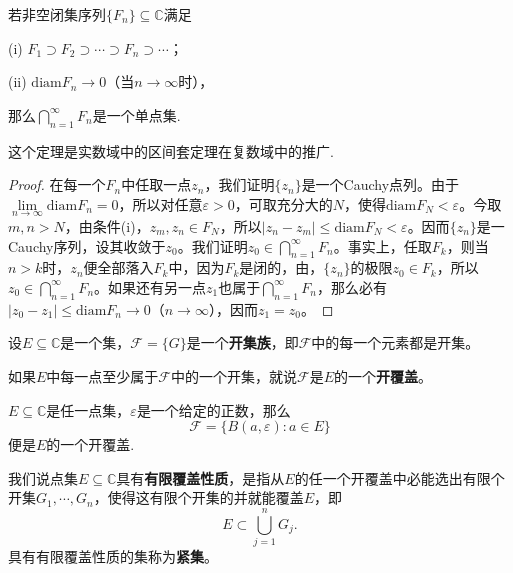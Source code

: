 \documentclass[../../main.tex]{subfiles}%
\begin{document}
\begin{theorem}[Cantor闭集套定理]\label{theorem:复变函数--Cantor闭集套定理}
若非空闭集序列\(\{ F_n \}\subseteq \mathbb{C}\)满足

(i) \(F_1 \supset F_2 \supset \cdots \supset F_n \supset \cdots\)；

(ii) \(\mathrm{diam}F_n \to 0\)（当\(n \to \infty\)时），

那么\(\bigcap_{n = 1}^\infty F_n\)是一个单点集.
\end{theorem}
\begin{note}
这个定理是实数域中的区间套定理在复数域中的推广.
\end{note}
\begin{proof}

在每一个\(F_n\)中任取一点\(z_n\)，我们证明\(\{ z_n \}\)是一个Cauchy点列。由于\(\lim\limits_{n \to \infty}\mathrm{diam}F_n = 0\)，所以对任意\(\varepsilon > 0\)，可取充分大的\(N\)，使得\(\mathrm{diam}F_N < \varepsilon\)。今取\(m, n > N\)，由条件(i)，\(z_m, z_n \in F_N\)，所以\(| z_n - z_m | \leqslant \mathrm{diam}F_N < \varepsilon\)。因而\(\{ z_n \}\)是一Cauchy序列，设其收敛于\(z_0\)。我们证明\(z_0 \in \bigcap_{n = 1}^\infty F_n\)。事实上，任取\(F_k\)，则当\(n > k\)时，\(z_n\)便全部落入\(F_k\)中，因为\(F_k\)是闭的，由，\(\{ z_n \}\)的极限\(z_0 \in F_k\)，所以\(z_0 \in \bigcap_{n = 1}^\infty F_n\)。如果还有另一点\(z_1\)也属于\(\bigcap_{n = 1}^\infty F_n\)，那么必有\(| z_0 - z_1 | \leqslant \mathrm{diam}F_n \to 0\)（\(n \to \infty\)），因而\(z_1 = z_0\)。 

\end{proof}

\begin{definition}
设\(E\subseteq \mathbb{C}\)是一个集，\(\mathscr{F} = \{ G \}\)是一个\textbf{开集族}，即\(\mathscr{F}\)中的每一个元素都是开集。

如果\(E\)中每一点至少属于\(\mathscr{F}\)中的一个开集，就说\(\mathscr{F}\)是\(E\)的一个\textbf{开覆盖}。
\end{definition}

\begin{example}
\(E\subseteq \mathbb{C}\)是任一点集，\(\varepsilon\)是一个给定的正数，那么
\[
\mathscr{F} = \{ B(a, \varepsilon) : a \in E \}
\]
便是\(E\)的一个开覆盖.
\end{example}

\begin{definition}
我们说点集\(E\subseteq \mathbb{C}\)具有\textbf{有限覆盖性质}，是指从\(E\)的任一个开覆盖中必能选出有限个开集\(G_1, \cdots, G_n\)，使得这有限个开集的并就能覆盖\(E\)，即
\[
E \subset \bigcup_{j = 1}^n G_j.
\]
具有有限覆盖性质的集称为\textbf{紧集}。
\end{definition}
\end{document}
